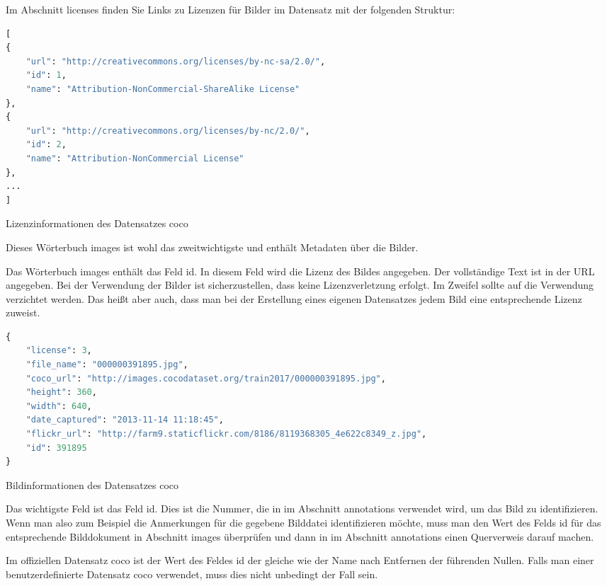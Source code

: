 \bigskip


Im Abschnitt licenses finden Sie Links zu Lizenzen für Bilder im Datensatz mit der folgenden Struktur:

\begin{code}
\begin{lstlisting}[language=python]
[
{
    "url": "http://creativecommons.org/licenses/by-nc-sa/2.0/", 
    "id": 1, 
    "name": "Attribution-NonCommercial-ShareAlike License"
},
{
    "url": "http://creativecommons.org/licenses/by-nc/2.0/", 
    "id": 2, 
    "name": "Attribution-NonCommercial License"
},
...
]
\end{lstlisting}
\caption{Lizenzinformationen des Datensatzes \ac{coco}}
\end{code}

\bigskip


\bigskip

Dieses Wörterbuch images ist wohl das zweitwichtigste und enthält Metadaten über die Bilder.

Das Wörterbuch images enthält das Feld id. In diesem Feld wird die Lizenz des Bildes angegeben. Der vollständige Text ist in der URL angegeben. Bei der Verwendung der Bilder ist sicherzustellen, dass keine Lizenzverletzung erfolgt. Im Zweifel sollte auf die Verwendung verzichtet werden. Das heißt aber auch, dass man bei der Erstellung eines eigenen Datensatzes jedem Bild eine entsprechende Lizenz zuweist. 


\begin{code}
\begin{lstlisting}[language=python]
{
    "license": 3,
    "file_name": "000000391895.jpg",
    "coco_url": "http://images.cocodataset.org/train2017/000000391895.jpg",
    "height": 360,
    "width": 640,
    "date_captured": "2013-11-14 11:18:45",
    "flickr_url": "http://farm9.staticflickr.com/8186/8119368305_4e622c8349_z.jpg",
    "id": 391895
}
\end{lstlisting}
\caption{Bildinformationen des Datensatzes \ac{coco}}
\end{code}


Das wichtigste Feld ist das Feld id. Dies ist die Nummer, die in im Abschnitt annotations verwendet wird, um das Bild zu identifizieren. Wenn man also zum Beispiel die Anmerkungen für die gegebene Bilddatei identifizieren möchte, muss man den Wert des Felds id für das entsprechende Bilddokument in Abschnitt images überprüfen und dann in im Abschnitt annotations einen Querverweis darauf machen.

Im offiziellen Datensatz \ac{coco} ist der Wert des Feldes id der gleiche wie der Name  nach Entfernen der führenden Nullen. Falls man einer benutzerdefinierte Datensatz \ac{coco} verwendet, muss dies nicht unbedingt der Fall sein. 

